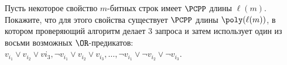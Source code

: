 Пусть некоторое свойство $m$-битных строк имеет $\PCPP$ длины $\ell(m)$. Покажите, что для этого свойства
существует $\PCPP$ длины $\poly(\ell(m))$, в котором проверяющий алгоритм делает $3$ запроса и затем
использует один из восьми возможных $\OR$-предикатов: $v_{i_1} \lor v_{i_2} \lor v{i_3}, \lnot v_{i_1}
\lor v_{i_2} \lor v_{i_3}, \dots, \lnot v_{i_1} \lor \lnot v_{i_2} \lor \lnot v_{i_3}$.
